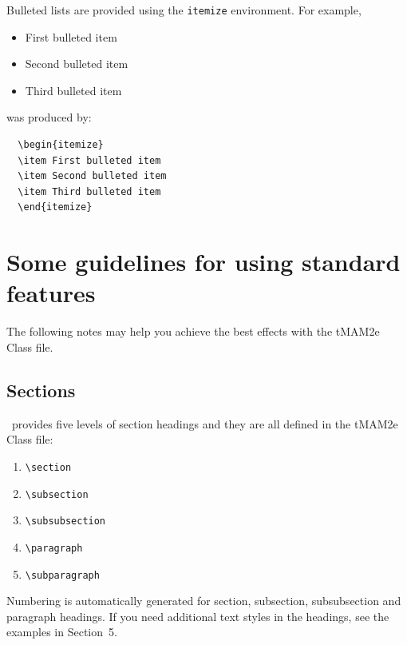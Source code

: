 \documentclass[]{tMAM2e}
\begin{document}
%
Bulleted lists are provided using the {\tt itemize} environment. For example,
\begin{itemize}
\item First bulleted item
\item Second bulleted item
\item Third bulleted item
\end{itemize}
was produced by:
\begin{verbatim}
  \begin{itemize}
  \item First bulleted item
  \item Second bulleted item
  \item Third bulleted item
  \end{itemize}
\end{verbatim}


\section[]{Some guidelines for using standard features}

The following notes may help you achieve the best effects with the
tMAM2e Class file.

\subsection{Sections}

\LaTeXe\ provides five levels of section headings and they are all
defined in the tMAM2e Class file:
\begin{enumerate}
   \item \verb"\section"
   \item \verb"\subsection"
   \item \verb"\subsubsection"
   \item \verb"\paragraph"
   \item \verb"\subparagraph"
\end{enumerate}
Numbering is automatically generated for section, subsection, subsubsection and paragraph headings.  If you need
additional text styles in the headings, see the examples in Section~5.
\end{document}
